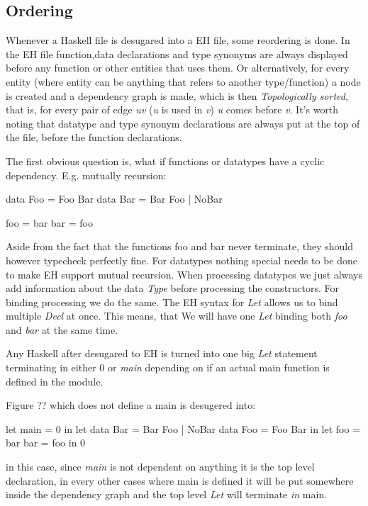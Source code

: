 \subsection{Ordering}
Whenever a Haskell file is desugared into a EH file, some reordering is done. In the EH file function,data declarations and type synonyms are always displayed before any function or other entities that uses them. Or alternatively, for every entity (where entity can be anything that refers to another type/function) a node is created and a dependency graph is made, which is then \emph{Topologically sorted}, that is, for every pair of edge \emph{uv} (\emph{u} is used in \emph{v}) \emph{u} comes before \emph{v}. It's worth noting that datatype and type synonym declarations are always put at the top of the file, before the function declarations.

The first obvious question is, what if functions or datatypes have a cyclic dependency. E.g. mutually recursion:

\begin{code}
data Foo = Foo Bar
data Bar = Bar Foo | NoBar

foo = bar
bar = foo
\end{code}

Aside from the fact that the functions foo and bar never terminate, they should however typecheck perfectly fine. For datatypes nothing special needs to be done to make EH support mutual recursion. When processing datatypes we just always add information about the data \emph{Type} before processing the constructors. For binding processing we do the same. The EH syntax for \emph{Let} allows us to bind multiple \emph{Decl} at once. This means, that We will have one \emph{Let} binding both \emph{foo} and \emph{bar} at the same time.

Any Haskell after desugared to EH is turned into one big \emph{Let} statement terminating in either 0 or \emph{main} depending on if an actual main function is defined in the module.

Figure ?? which does not define a main is desugered into:

\begin{code}
let main = 0
in let data Bar  = Bar Foo | NoBar
       data Foo  = Foo Bar
   in let foo = bar
          bar = foo
      in 0
\end{code}

in this case, since \emph{main} is not dependent on anything it is the top level declaration, in every other cases where main is defined it will be put somewhere inside the dependency graph and the top level \emph{Let} will terminate \emph{in} main.
